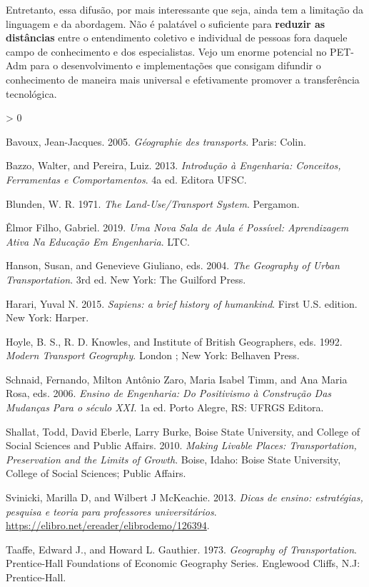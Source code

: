 \documentclass[
]{book}
\newlength{\cslhangindent}
\newenvironment{CSLReferences}[2] %
 {%
  \setlength{\parindent}{0pt}
  \ifodd #1 \everypar{\setlength{\hangindent}{\cslhangindent}}\ignorespaces\fi
  \ifnum #2 > 0
  \setlength{\parskip}{#2\baselineskip}
  \fi
 }%
 {}
\begin{document}
Entretanto, essa difusão, por mais interessante que seja, ainda tem a
limitação da linguagem e da abordagem. Não é palatável o suficiente para
\textbf{reduzir as distâncias} entre o entendimento coletivo e
individual de pessoas fora daquele campo de conhecimento e dos
especialistas. Vejo um enorme potencial no PET-Adm para o
desenvolvimento e implementações que consigam difundir o conhecimento de
maneira mais universal e efetivamente promover a transferência
tecnológica.

\hypertarget{refs}{}
\begin{CSLReferences}{1}{0}
\leavevmode\hypertarget{ref-bavoux2005}{}%
Bavoux, Jean-Jacques. 2005. \emph{Géographie des transports}. Paris:
Colin.

\leavevmode\hypertarget{ref-bazzo2013}{}%
Bazzo, Walter, and Pereira, Luiz. 2013. \emph{Introdução à Engenharia:
Conceitos, Ferramentas e Comportamentos}. 4a ed. Editora UFSC.

\leavevmode\hypertarget{ref-blunden1971}{}%
Blunden, W. R. 1971. \emph{The Land-Use/Transport System}. Pergamon.

\leavevmode\hypertarget{ref-uxealmorfilho2019}{}%
Êlmor Filho, Gabriel. 2019. \emph{Uma Nova Sala de Aula é Possível:
Aprendizagem Ativa Na Educação Em Engenharia}. LTC.

\leavevmode\hypertarget{ref-thegeog2004}{}%
Hanson, Susan, and Genevieve Giuliano, eds. 2004. \emph{The Geography of
Urban Transportation}. 3rd ed. New York: The Guilford Press.

\leavevmode\hypertarget{ref-harari2015a}{}%
Harari, Yuval N. 2015. \emph{Sapiens: a brief history of humankind}.
First U.S. edition. New York: Harper.

\leavevmode\hypertarget{ref-modernt1992}{}%
Hoyle, B. S., R. D. Knowles, and Institute of British Geographers, eds.
1992. \emph{Modern Transport Geography}. London ; New York: Belhaven
Press.

\leavevmode\hypertarget{ref-ensinod2006}{}%
Schnaid, Fernando, Milton Antônio Zaro, Maria Isabel Timm, and Ana Maria
Rosa, eds. 2006. \emph{Ensino de Engenharia: Do Positivismo à Construção
Das Mudanças Para o século XXI}. 1a ed. Porto Alegre, RS: UFRGS Editora.

\leavevmode\hypertarget{ref-shallat2010}{}%
Shallat, Todd, David Eberle, Larry Burke, Boise State University, and
College of Social Sciences and Public Affairs. 2010. \emph{Making
Livable Places: Transportation, Preservation and the Limits of Growth}.
Boise, Idaho: Boise State University, College of Social Sciences; Public
Affairs.

\leavevmode\hypertarget{ref-svinicki2013}{}%
Svinicki, Marilla D, and Wilbert J McKeachie. 2013. \emph{Dicas de
ensino: estratégias, pesquisa e teoria para professores universitários}.
\url{https://elibro.net/ereader/elibrodemo/126394}.

\leavevmode\hypertarget{ref-taaffe1973}{}%
Taaffe, Edward J., and Howard L. Gauthier. 1973. \emph{Geography of
Transportation}. Prentice-Hall Foundations of Economic Geography Series.
Englewood Cliffs, N.J: Prentice-Hall.

\end{CSLReferences}

\backmatter
\end{document}
